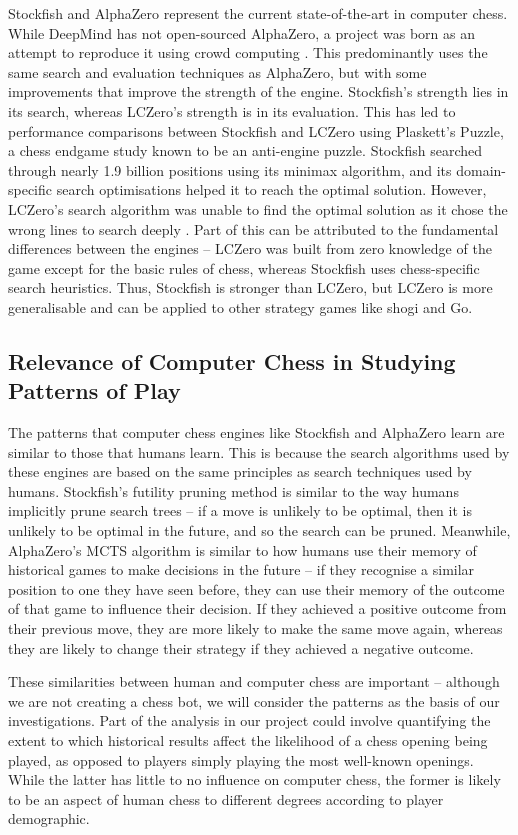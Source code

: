 \documentclass[%
 superscriptaddress,
showpacs,preprintnumbers,
 amsmath,
 amssymb,
 aps,
 pra,
showkeys,
onecolumn,
notitlepage,
11pt,
tightenlines      %
]{revtex4-1}
\begin{document}
Stockfish and AlphaZero represent the current state-of-the-art in computer chess. While DeepMind has not open-sourced AlphaZero, a project  was born as an attempt to reproduce it using crowd computing \cite{maharaj2022chess}. This predominantly uses the same search and evaluation techniques as AlphaZero, but with some improvements that improve the strength of the engine. Stockfish's strength lies in its search, whereas LCZero's strength is in its evaluation. This has led to performance comparisons between Stockfish and LCZero using Plaskett's Puzzle, a chess endgame study known to be an anti-engine puzzle. Stockfish searched through nearly 1.9 billion positions using its minimax algorithm, and its domain-specific search optimisations helped it to reach the optimal solution. However, LCZero's search algorithm was unable to find the optimal solution as it chose the wrong lines to search deeply \cite{maharaj2022chess}. Part of this can be attributed to the fundamental differences between the engines -- LCZero was built from zero knowledge of the game except for the basic rules of chess, whereas Stockfish uses chess-specific search heuristics. Thus, Stockfish is stronger than LCZero, but LCZero is more generalisable and can be applied to other strategy games like shogi and Go.

\subsection{Relevance of Computer Chess in Studying Patterns of Play}
The patterns that computer chess engines like Stockfish and AlphaZero learn are similar to those that humans learn. This is because the search algorithms used by these engines are based on the same principles as search techniques used by humans. Stockfish's futility pruning method is similar to the way humans implicitly prune search trees -- if a move is unlikely to be optimal, then it is unlikely to be optimal in the future, and so the search can be pruned. Meanwhile, AlphaZero's MCTS algorithm is similar to how humans use their memory of historical games to make decisions in the future -- if they recognise a similar position to one they have seen before, they can use their memory of the outcome of that game to influence their decision. If they achieved a positive outcome from their previous move, they are more likely to make the same move again, whereas they are likely to change their strategy if they achieved a negative outcome.

These similarities between human and computer chess are important -- although we are not creating a chess bot, we will consider the patterns as the basis of our investigations. Part of the analysis in our project could involve quantifying the extent to which historical results affect the likelihood of a chess opening being played, as opposed to players simply playing the most well-known openings. While the latter has little to no influence on computer chess, the former is likely to be an aspect of human chess to different degrees according to player demographic.
\end{document}
